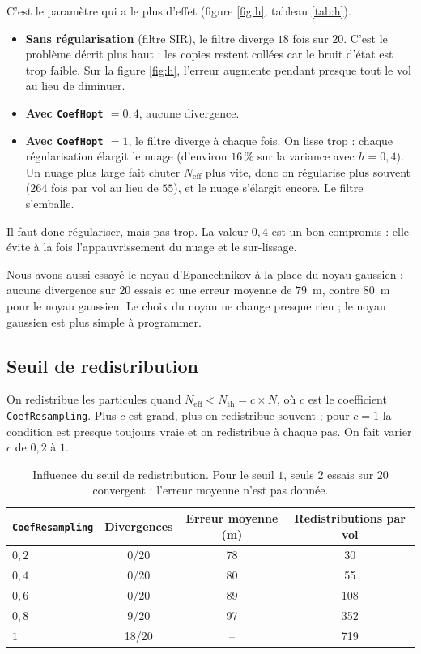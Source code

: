 \documentclass[11pt]{article}
\begin{document}
C'est le paramètre qui a le plus d'effet (figure \ref{fig:h}, tableau \ref{tab:h}).

\begin{itemize}
\item \textbf{Sans régularisation} (filtre SIR), le filtre diverge $18$ fois sur $20$.
C'est le problème décrit plus haut : les copies restent collées car le bruit d'état
est trop faible. Sur la figure \ref{fig:h}, l'erreur augmente pendant presque tout le vol au lieu de diminuer.
\item \textbf{Avec \texttt{CoefHopt} $= 0{,}4$}, aucune divergence.
\item \textbf{Avec \texttt{CoefHopt} $= 1$}, le filtre diverge à chaque fois. On lisse
trop : chaque régularisation élargit le nuage (d'environ $16\,\%$ sur la variance avec
$h = 0{,}4$). Un nuage plus large fait chuter $N_{\mathrm{eff}}$ plus vite, donc on
régularise plus souvent ($264$ fois par vol au lieu de $55$), et le nuage s'élargit
encore. Le filtre s'emballe.
\end{itemize}

Il faut donc régulariser, mais pas trop. La valeur $0{,}4$ est un bon
compromis : elle évite à la fois l'appauvrissement du nuage et le sur-lissage.

Nous avons aussi essayé le noyau d'Epanechnikov à la place du noyau gaussien : aucune
divergence sur $20$ essais et une erreur moyenne de $79$~m, contre $80$~m pour le noyau
gaussien. Le choix du noyau ne change presque rien ; le noyau gaussien est plus simple
à programmer.

\subsection{Seuil de redistribution}

On redistribue les particules quand $N_{\mathrm{eff}} < N_{\mathrm{th}} = c \times N$,
où $c$ est le coefficient \texttt{CoefResampling}. Plus $c$ est grand, plus on
redistribue souvent ; pour $c = 1$ la condition est presque toujours vraie et on
redistribue à chaque pas. On fait varier $c$ de $0{,}2$ à $1$.

\begin{table}[H]
\centering
\begin{tabular}{lccc}
\toprule
\texttt{CoefResampling} & Divergences & Erreur moyenne (m) & Redistributions par vol \\
\midrule
$0{,}2$ & 0/20 & 78 & 30 \\
$0{,}4$ & 0/20 & 80 & 55 \\
$0{,}6$ & 0/20 & 89 & 108 \\
$0{,}8$ & 9/20 & 97 & 352 \\
$1$ & 18/20 & -- & 719 \\
\bottomrule
\end{tabular}
\caption{Influence du seuil de redistribution. Pour le seuil $1$, seuls $2$ essais sur $20$ convergent : l'erreur moyenne n'est pas donnée.}
\end{table}
\end{document}
